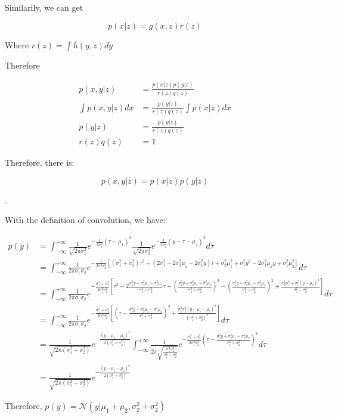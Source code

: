 \documentclass[UTF8]{article}
\begin{document}
Similarily, we can get

$$p(x|z) = g(x,z)r(z)$$

Where $r(z) = \int h(y,z)dy$

Therefore

\begin{align*}
    p(x,y|z) &= \frac{p(x|z)p(y|z)}{r(z)q(z)} \\
    \int p(x,y|z)dx& = \frac{p(y|z)}{r(z)q(z)}\int p(x|z)dx\\
    p(y|z) &= \frac{p(y|z)}{r(z)q(z)}\\
    r(z)q(z) & = 1
\end{align*}

Therefore, there is:

$$p(x,y|z) = p(x|z)p(y|z)$$

\qedsymbol

.

With the definition of convolution, we have:

\begin{align*}
    p(y)& = \int_{-\infty}^{+\infty}\frac{1}{\sqrt{2\pi\sigma_1^2}}e^{-\frac{1}{2\sigma_1^2}(\tau-\mu_1)^2}\frac{1}{\sqrt{2\pi\sigma_2^2}}e^{-\frac{1}{2\sigma_2^2}(y-\tau-\mu_2)^2}d\tau\\
        &= \int_{-\infty}^{+\infty}\frac{1}{2\pi\sigma_1\sigma_2}e^{-\frac{1}{2\sigma_1^2\sigma_2^2}[(\sigma_1^2+\sigma_2^2)\tau^2+(2\sigma_1^2-2\sigma_2^2\mu_1-2\sigma_1^2y)\tau+\sigma_2^2\mu_1^2+\sigma_1^2y^2-2\sigma_1^2\mu_2y+\sigma_1^2\mu_2^2]}d\tau\\
        &= \int_{-\infty}^{+\infty}\frac{1}{2\pi\sigma_1\sigma_2}e^{-\frac{\sigma_1^2+\sigma_2^2}{2\sigma_1^2\sigma_2^2}[\tau^2-2\frac{\sigma_1^2 y+\sigma_2^2 \mu_1-\sigma_1^2 \mu_2}{\sigma_1^2+\sigma_2^2}\tau+(\frac{\sigma_1^2 y+\sigma_2^2 \mu_1-\sigma_1^2 \mu_2}{\sigma_1^2+\sigma_2^2})^2-(\frac{\sigma_1^2 y+\sigma_2^2 \mu_1-\sigma_1^2 \mu_2}{\sigma_1^2+\sigma_2^2})^2+\frac{\sigma_2^2 \mu_1^2+\sigma_1^2(y-\mu_2)^2}{\sigma_1^2+\sigma_2^2}]}d\tau\\
        &= \int_{-\infty}^{+\infty}\frac{1}{2\pi\sigma_1\sigma_2}e^{-\frac{\sigma_1^2+\sigma_2^2}{2\sigma_1^2\sigma_2^2}[(\tau-\frac{\sigma_1^2 y+\sigma_2^2 \mu_1-\sigma_1^2 \mu_2}{\sigma_1^2+\sigma_2^2})^2+\frac{\sigma_1^2\sigma_2^2(y-\mu_1-\mu_2)^2}{(\sigma_1^2+\sigma_2^2)^2}]}d\tau\\
        & = \frac{1}{\sqrt{2\pi(\sigma_1^2+\sigma_2^2)}}e^{-\frac{(y-\mu_1-\mu_2)^2}{2(\sigma_1^2+\sigma_2^2)}}\int_{-\infty}^{+\infty}\frac{1}{2\pi\sqrt{\frac{\sigma_1^2\sigma_2^2}{\sigma_1^2+\sigma_2^2}}}e^{-\frac{\sigma_1^2+\sigma_2^2}{2\sigma_1^2\sigma_2^2}(\tau-\frac{\sigma_1^2 y+\sigma_2^2 \mu_1-\sigma_1^2 \mu_2}{\sigma_1^2+\sigma_2^2})^2}d\tau\\
        & = \frac{1}{\sqrt{2\pi(\sigma_1^2+\sigma_2^2)}}e^{-\frac{(y-\mu_1-\mu_2)^2}{2(\sigma_1^2+\sigma_2^2)}}
\end{align*}

Therefore, $p(y) = \mathcal{N}(y|\mu_1+\mu_2, \sigma_2^2+\sigma_2^2)$
\end{document}
